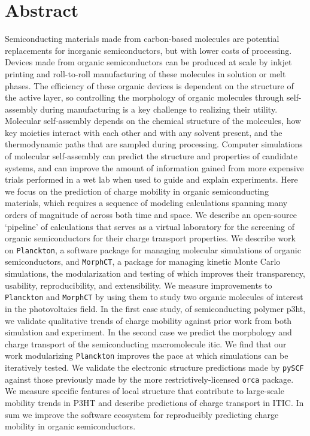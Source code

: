 
\chapter*{Abstract}

Semiconducting materials made from carbon-based molecules are potential replacements for inorganic semiconductors, but with lower costs of processing.
Devices made from organic semiconductors can be produced at scale by inkjet printing and roll-to-roll manufacturing of these molecules in solution or melt phases.  
The efficiency of these organic devices is dependent on the structure of the active layer, so controlling the morphology of organic molecules through self-assembly during manufacturing is a key challenge to realizing their utility.
Molecular self-assembly depends on the chemical structure of the molecules, how key moieties interact with each other and with any solvent present, and the thermodynamic paths that are sampled during processing.
Computer simulations of molecular self-assembly can predict the structure and properties of candidate systems, and can improve the amount of information gained from more expensive trials performed in a wet lab when used to guide and explain experiments.
Here we focus on the prediction of charge mobility in organic semiconducting materials,
which requires a sequence of modeling calculations spanning many orders of magnitude of across both time and space.
We describe an open-source `pipeline' of calculations that serves as a virtual laboratory for the screening of organic semiconductors for their charge transport properties.
We describe work on \texttt{Planckton}, a software package for managing molecular simulations of organic semiconductors, and \texttt{MorphCT},
a package for managing kinetic Monte Carlo simulations, the modularization and testing of which improves their transparency, usability, reproducibility, and extensibility.
We measure improvements to \texttt{Planckton} and \texttt{MorphCT} by using them to study two organic molecules of interest in the photovoltaics field.
In the first case study, of semiconducting polymer \gls{p3ht}, 
we validate qualitative trends of charge mobility against prior work from both simulation and experiment.
In the second case we predict the morphology and charge transport of the semiconducting macromolecule 
\gls{itic}.
We find that our work modularizing \texttt{Planckton} improves the pace at which simulations can be iteratively tested.
We validate the electronic structure predictions made by \texttt{pySCF} against those previously made by the more restrictively-licensed \texttt{orca} package.
We measure specific features of local structure that contribute to large-scale mobility trends in P3HT and describe predictions of charge transport in ITIC.
In sum we improve the software ecosystem for reproducibly predicting charge mobility in organic semiconductors.

